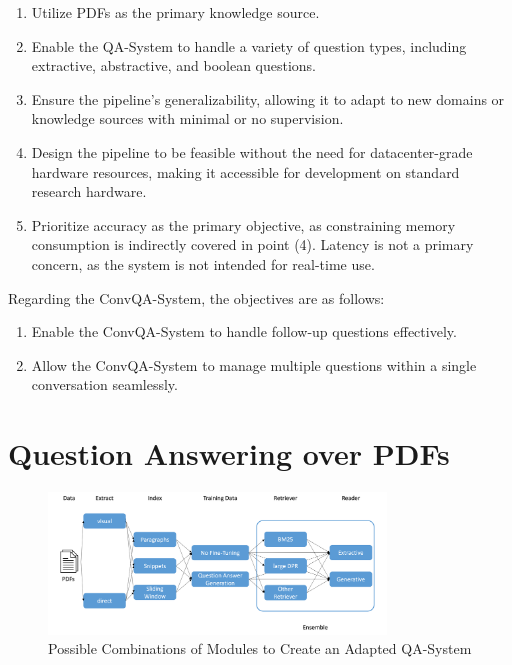 \begin{enumerate}
    \item Utilize PDFs as the primary knowledge source.
    \item Enable the QA-System to handle a variety of question types, including extractive, abstractive, and boolean questions.
    \item Ensure the pipeline's generalizability, allowing it to adapt to new domains or knowledge sources with minimal or no supervision.
    \item Design the pipeline to be feasible without the need for datacenter-grade hardware resources, making it accessible for development on standard research hardware.
    \item Prioritize accuracy as the primary objective, as constraining memory consumption is indirectly covered in point (4). Latency is not a primary concern, as the system is not intended for real-time use.
\end{enumerate}

Regarding the ConvQA-System, the objectives are as follows:

\begin{enumerate}
    \item Enable the ConvQA-System to handle follow-up questions effectively.
    \item Allow the ConvQA-System to manage multiple questions within a single conversation seamlessly.
\end{enumerate}

\section{Question Answering over PDFs}
\label{sec:qa-over-pdfs}

\begin{figure}
    \centering
    \includegraphics[width=0.8\textwidth]{Grafiken/Possible_Systems.png}
    \caption{Possible Combinations of Modules to Create an Adapted QA-System}
    \label{fig:qa-system-combinations}
\end{figure}

